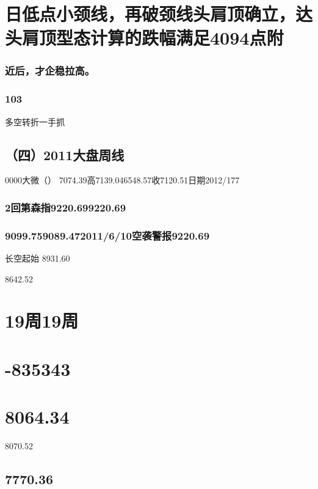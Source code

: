 \documentclass{article}
\begin{document}
\section{日低点小颈线，再破颈线头肩顶确立，达头肩顶型态计算的跌幅满足4094点附}

\subsubsection{近后，才企稳拉高。}

\subsubsection{103}

\clearpage

多空转折一手抓

\subsection{（四）2011大盘周线}

0000大微（） 7074.39高7139.046548.57收7120.51日期2012/177

\subsubsection{2回第森指9220.699220.69}

\subsubsection{9099.759089.472011/6/10空袭警报9220.69}

长空起始 8931.60

8642.52

\section{19周19周}

\section{-835343}

\section{8064.34}

8070.52

\subsection{7770.36}
\end{document}

